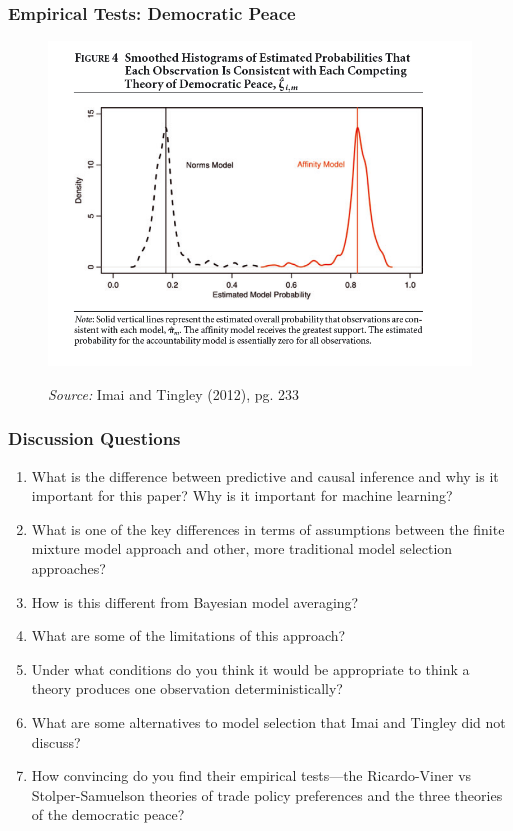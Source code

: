 \documentclass{beamer}
\begin{document}
\begin{frame}
\frametitle{Empirical Tests: Democratic Peace}
\begin{figure}
	\centering
	\includegraphics[width=0.7\linewidth]{figure4_dem_peace}
	\caption{}
	
	\textit{Source:} Imai and Tingley (2012), pg. 233
	\label{fig:figure4_dem_peace}
\end{figure}
\end{frame}

\begin{frame}
\frametitle{Discussion Questions}
\begin{enumerate}
	\item What is the difference between predictive and causal inference and why is it important for this paper? Why is it important for machine learning?
	\item What is one of the key differences in terms of assumptions between the finite mixture model approach and other, more traditional model selection approaches?
	\item How is this different from Bayesian model averaging?
	\item What are some of the limitations of this approach? 
	\item Under what conditions do you think it would be appropriate to think a theory produces one observation deterministically?
	\item What are some alternatives to model selection that Imai and Tingley did not discuss?
	\item How convincing do you find their empirical tests---the Ricardo-Viner vs Stolper-Samuelson theories of trade policy preferences and the three theories of the democratic peace?
\end{enumerate}
\end{frame}
\end{document}

